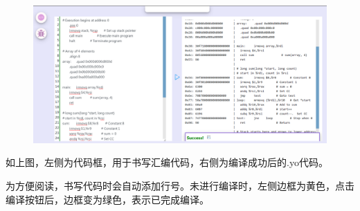 \documentclass[12pt]{article} %
\begin{document}
\begin{sloppypar}
\begin{figure}[htbp]
\begin{center}
\includegraphics[width=\linewidth]{asset/2.png}
\end{center}
\end{figure}

如上图，左侧为代码框，用于书写汇编代码，右侧为编译成功后的.yo代码。

为方便阅读，书写代码时会自动添加行号。未进行编译时，左侧边框为黄色，点击编译按钮后，边框变为绿色，表示已完成编译。


\begin{figure}[htbp]
\centering
{}%
%
\centering
\end{figure}


\end{sloppypar}
\end{document}

